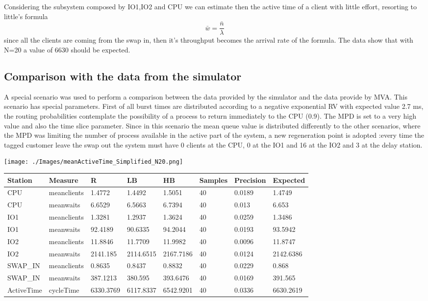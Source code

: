 \documentclass[12pt,a4paper]{article}
\begin{document}
Considering the subsystem composed by IO1,IO2 and CPU we can estimate then the active time of a client with little effort, resorting to little's formula
$$
    \bar{w}= \frac{\bar{n}}{\lambda}
$$
since all the clients are coming from the swap in, then it's throughput becomes the arrival rate of the formula. The data show that with N=20 a value of 6630 should be expected.

\subsection{Comparison with the data from the simulator}
A special scenario was used to perform a comparison between the data provided by the simulator and the data provide by MVA. This scenario has special parameters. First of all burst times are distributed according to a negative exponential RV with expected value 2.7 ms, the routing probabilities contemplate the possibility of a process to return immediately to the CPU (0.9). The MPD is set to a very high value and also the time slice parameter. Since in this scenario the mean queue value is distributed differently to the other scenarios, where the MPD was limiting the number of process available in the active part of the system, a new regeneration point is adopted :every time the tagged customer leave the swap out the system must have 0 clients at the CPU, 0 at the IO1 and 16 at the IO2 and 3 at the delay station.

\texttt{[image: ./Images/meanActiveTime\_Simplified\_N20.png]}

\begin{table}[!ht]
    \centering
    \begin{tabular}{|l|l|l|l|l|l|l|l|}
    \hline
    Station & Measure & R & LB & HB & Samples & Precision & Expected \\ \hline
    CPU & meanclients & 1.4772 & 1.4492 & 1.5051 & 40 & 0.0189 & 1.4749 \\ \hline
    CPU & meanwaits & 6.6529 & 6.5663 & 6.7394 & 40 & 0.013 & 6.653 \\ \hline
    IO1 & meanclients & 1.3281 & 1.2937 & 1.3624 & 40 & 0.0259 & 1.3486 \\ \hline
    IO1 & meanwaits & 92.4189 & 90.6335 & 94.2044 & 40 & 0.0193 & 93.5942 \\ \hline
    IO2 & meanclients & 11.8846 & 11.7709 & 11.9982 & 40 & 0.0096 & 11.8747 \\ \hline
    IO2 & meanwaits & 2141.185 & 2114.6515 & 2167.7186 & 40 & 0.0124 & 2142.6386 \\ \hline
    SWAP\_IN & meanclients & 0.8635 & 0.8437 & 0.8832 & 40 & 0.0229 & 0.868 \\ \hline
    SWAP\_IN & meanwaits & 387.1213 & 380.595 & 393.6476 & 40 & 0.0169 & 391.565 \\ \hline
    ActiveTime & cycleTime & 6330.3769 & 6117.8337 & 6542.9201 & 40 & 0.0336 & 6630.2619 \\ \hline
    \end{tabular}
\end{table}
\end{document}
